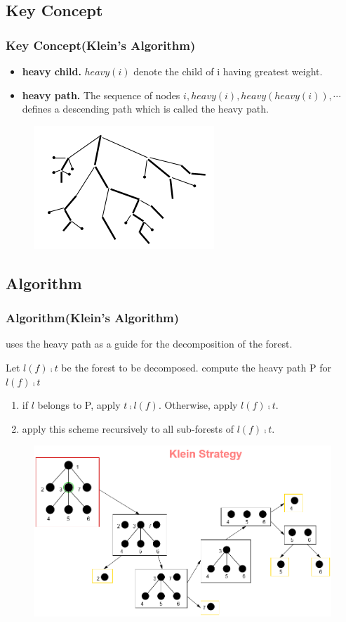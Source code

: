\documentclass{beamer}
\begin{document}
\subsection{Key Concept}
\begin{frame}
\frametitle{Key Concept(Klein's Algorithm)}
\begin{itemize}
\item \textbf{heavy child.} $heavy(i)$ denote the child of i having greatest weight.
\item \textbf{heavy path.} The sequence of nodes $i, heavy(i), heavy(heavy(i)), \cdots$ defines a descending path which is called the heavy path.
\end{itemize}
\begin{figure}
	\includegraphics[width=0.4\linewidth]{heavypath}
	\label{Heavy Path}
	\centering
\end{figure}
\end{frame}

\subsection{Algorithm}
\begin{frame}
\frametitle{Algorithm(Klein's Algorithm)}
uses the heavy path as a guide for the decomposition of the forest.

Let $l(f) \comp t$ be the forest to be decomposed.
compute the heavy path P for $l(f) \comp t$

\begin{enumerate}[1)]
\item if $l$ belongs to P, apply $t \comp l(f)$. Otherwise, apply $l(f) \comp t$.
\item apply this scheme recursively to all sub-forests of $l(f) \comp t$.
\end{enumerate}

\begin{figure}
	\includegraphics[width=0.7\linewidth]{heavypathdecomposition}
	\label{Heavy Path Decomposition} 
	\centering
\end{figure}
\end{frame}
\end{document}
